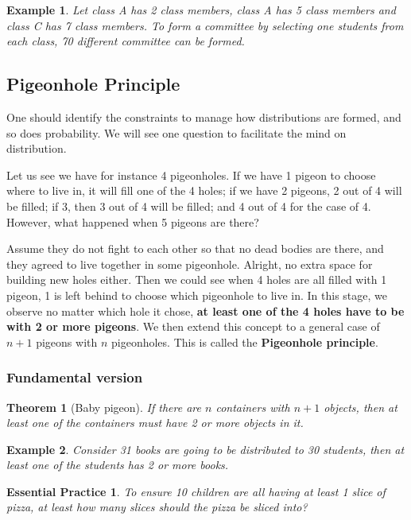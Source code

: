 \documentclass[12pt]{article}
\newtheorem*{theorem}{Theorem}
\newtheorem*{example}{Example}
\newtheorem{exercise}{Essential Practice}[subsection]
\begin{document}
    \begin{example}
        Let class A has 2 class members, class A has 5 class members and class C has 7 class members. To form a committee by selecting one students from each class, 70 different committee can be formed.
    \end{example}

    \subsection{Pigeonhole Principle}

    One should identify the constraints to manage how distributions are formed, and so does probability. We will see one question to facilitate the mind on distribution.

    Let us see we have for instance 4 pigeonholes. If we have 1 pigeon to choose where to live in, it will fill one of the 4 holes; if we have 2 pigeons, 2 out of 4 will be filled; if 3, then 3 out of 4 will be filled; and 4 out of 4 for the case of 4. However, what happened when 5 pigeons are there?
    
    Assume they do not fight to each other so that no dead bodies are there, and they agreed to live together in some pigeonhole. Alright, no extra space for building new holes either. Then we could see when 4 holes are all filled with 1 pigeon, 1 is left behind to choose which pigeonhole to live in. In this stage, we observe no matter which hole it chose, \textbf{at least one of the 4 holes have to be with 2 or more pigeons}. We then extend this concept to a general case of $n+1$ pigeons with $n$ pigeonholes. This is called the \textbf{Pigeonhole principle}.

    \subsubsection*{Fundamental version}

    \begin{theorem}[Baby pigeon]
        If there are $n$ containers with $n+1$ objects, then at least one of the containers must have 2 or more objects in it.
    \end{theorem}

    \begin{example}
        Consider 31 books are going to be distributed to 30 students, then at least one of the students has 2 or more books.
    \end{example}

    \begin{exercise}
        To ensure 10 children are all having at least 1 slice of pizza, at least how many slices should the pizza be sliced into?
    \end{exercise}
\end{document}
